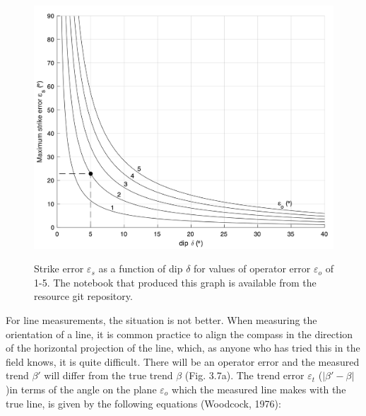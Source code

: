 \documentclass[a4paper , 12pt]{book}
\begin{document}
\begin{figure}[ht]
    \centering
    {\includegraphics[width=13cm]{Figures/ch3f6.png}}
    \caption{Strike error $\varepsilon_s$ as a function of dip $\delta$ for values of operator error $\varepsilon_o$  of 1-5\degree. The notebook that produced this graph is available from the resource git repository.}
\end{figure}

For line measurements, the situation is not better. When measuring the orientation of a line, it is common practice to align the compass in the direction of the horizontal projection of the line, which, as anyone who has tried this in the field knows, it is quite difficult. There will be an operator error and the measured trend $\beta\text{$'$}$ will differ from the true trend $\beta$ (Fig. 3.7a). The trend error $\varepsilon_t$ ($|\beta\text{$'$}- \beta|$)in terms of the angle on the plane $\varepsilon_o$ which the measured line makes with the true line, is given by the following equations (Woodcock, 1976): 
\end{document}

